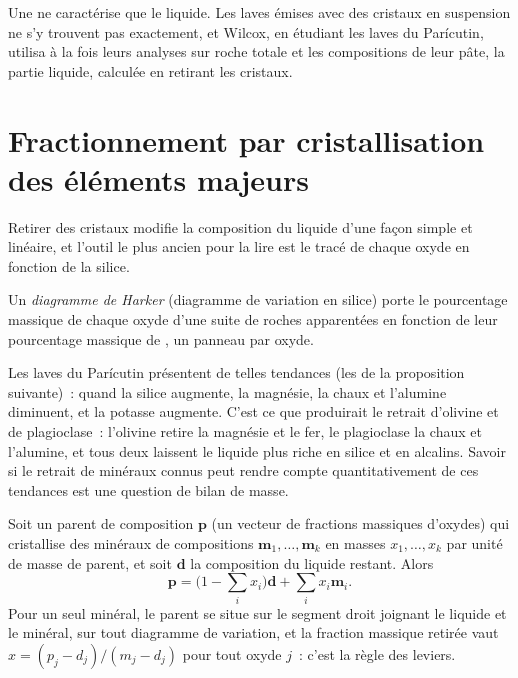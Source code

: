Une  ne caractérise que le liquide. Les laves émises avec
des cristaux en suspension ne s'y trouvent pas exactement, et Wilcox, en étudiant les laves du
Parícutin, utilisa à la fois leurs analyses sur roche totale et les compositions de leur pâte, la partie
liquide, calculée en retirant les cristaux.

\section{Fractionnement par cristallisation des éléments majeurs}\label{sec:b2:magmatic-differentiation:majors}

Retirer des cristaux modifie la composition du liquide d'une façon simple et linéaire,
et l'outil le plus ancien pour la lire est le tracé de chaque oxyde en fonction de la silice.

\begin{definition}\label{def:b2:magmatic-differentiation:harker}
Un \emph{diagramme de Harker} (diagramme de variation en silice) porte le
pourcentage massique de chaque oxyde d'une suite de roches apparentées en fonction de leur
pourcentage massique de , un panneau par oxyde.
\end{definition}


Les laves du Parícutin présentent de telles tendances (les  de la
proposition suivante)~: quand la silice augmente, la magnésie, la chaux et l'alumine diminuent, et la potasse
augmente. C'est ce que produirait le retrait d'olivine et de plagioclase~:
l'olivine retire la magnésie et le fer, le plagioclase la chaux et l'alumine, et tous deux laissent le liquide
plus riche en silice et en alcalins. Savoir si le retrait de minéraux connus peut rendre compte
quantitativement de ces tendances est une question de bilan de masse.

\begin{proposition}\label{prop:b2:magmatic-differentiation:lever}
Soit un  parent de composition $\mathbf p$ (un vecteur de fractions massiques d'oxydes)
qui cristallise des minéraux de compositions $\mathbf m_1, \dots, \mathbf m_k$ en masses
$x_1, \dots, x_k$ par unité de masse de parent, et soit $\mathbf d$ la composition
du liquide restant. Alors
\[
\mathbf p = \Big(1 - \sum_i x_i\Big)\mathbf d + \sum_i x_i \mathbf m_i .
\]
Pour un seul minéral, le parent se situe sur le segment droit joignant le liquide et le
minéral, sur tout diagramme de variation, et la fraction massique retirée vaut
$x = (p_j - d_j)/(m_j - d_j)$ pour tout oxyde $j$~: c'est la règle des leviers.
\end{proposition}

